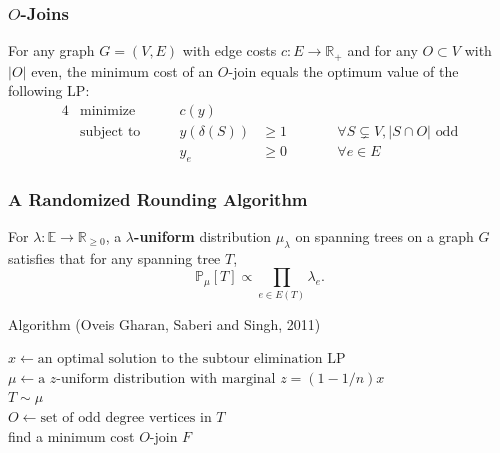\documentclass{beamer}
\newcommand{\RR}{\mathbb{R}}
\newcommand{\EE}{\mathbb{E}}
\newcommand{\PP}{\mathbb{P}}
\begin{document}
  \begin{frame}
    \frametitle{$O$-Joins}
  
    \begin{theorem}
      For any graph $G = (V, E)$ with edge costs $c : E \to \RR_+$ and for any $O \subset V$ with $|O|$ even, the minimum cost of an $O$-join equals the optimum value of the following LP:
      \begin{alignat*}{4}
        & \text{minimize} \qquad & c(y) \\
        & \text{subject to} \qquad & y(\delta(S)) &\geq 1 && \qquad \forall S \subsetneq V, |S \cap O| \text{ odd} \\
        & & y_e &\geq 0 && \qquad \forall e \in E
      \end{alignat*}
    \end{theorem}
  
  \end{frame}

  \begin{frame}
    \frametitle{A Randomized Rounding Algorithm}

    \begin{definition}
      For $\lambda: \EE \to \RR_{\geq 0}$, a {\bf $\lambda$-uniform} distribution $\mu_\lambda$ on spanning trees on a graph $G$ satisfies that for any spanning tree $T$,
      $$ \PP_\mu[T] \propto \prod_{e \in E(T)} \lambda_e. $$
    \end{definition}

    \pause
  
    \begin{block}{Algorithm (Oveis Gharan, Saberi and Singh, 2011)}
      \begin{algorithm}[H]
        $x \leftarrow \text{an optimal solution to the subtour elimination LP}$ \\
        $\mu \leftarrow \text{a $z$-uniform distribution with marginal $z = (1 - 1/n) x$}$ \\
        $T \sim \mu$ \\
        $O \leftarrow \text{set of odd degree vertices in $T$}$ \\
        find a minimum cost $O$-join $F$ \\
      \end{algorithm}
    \end{block}
  
  \end{frame}
\end{document}
